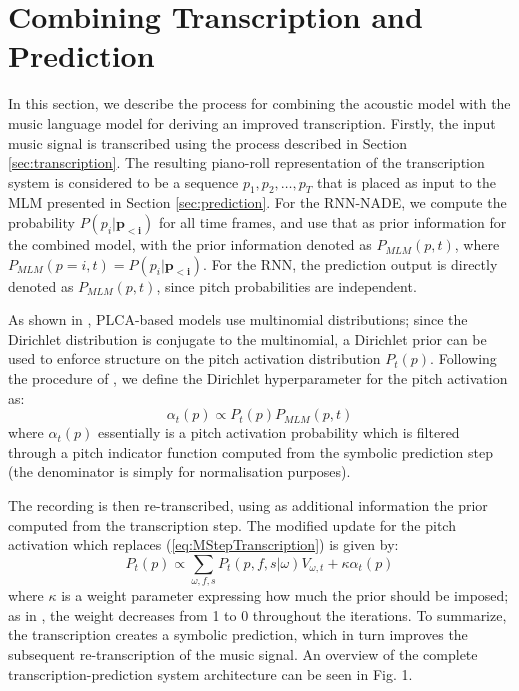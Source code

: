 \section{Combining Transcription and Prediction}
\label{sec:combination}


In this section, we describe the process for combining the acoustic model with the music language model for deriving an improved transcription. Firstly, the input music signal is transcribed using the process described in Section \ref{sec:transcription}. The resulting piano-roll representation of the transcription system is considered to be a sequence $p_1, p_2, \ldots, p_T$ that is placed as input to the MLM presented in Section \ref{sec:prediction}. For the RNN-NADE, we compute the probability $P(p_i|\mathbf{p_{<i}})$ for all time frames, and use that as prior information for the combined model, with the prior information  denoted as $P_{\mathit{MLM}}(p,t)$, where $P_{\mathit{MLM}}(p=i,t)=P(p_i|\mathbf{p_{<i}})$. For the RNN, the prediction output is directly denoted as $P_{\mathit{MLM}}(p,t)$, since pitch probabilities are independent.

As shown in \cite{Smaragdis2009}, PLCA-based models use multinomial distributions; since the Dirichlet distribution is conjugate to the multinomial, a Dirichlet prior can be used to enforce structure on the pitch activation distribution $P_{t}(p)$. Following the procedure of \cite{Smaragdis2009}, we define the Dirichlet hyperparameter for the pitch activation as:
\begin{equation}
 \alpha_{t}(p) \propto P_{t}(p)P_{\mathit{MLM}}(p,t)
\end{equation}
where $\alpha_{t}(p)$ essentially is a pitch activation probability which is filtered through a pitch indicator function computed from the symbolic prediction step (the denominator is simply for normalisation purposes).

The recording is then re-transcribed, using as additional information the prior computed from the transcription step. The modified update for the pitch activation which replaces (\ref{eq:MStepTranscription}) is given by:
\begin{equation}
 P_{t}(p) \propto \sum_{\omega,f,s}P_{t}(p,f,s|\omega)V_{\omega,t}+\kappa\alpha_{t}(p) \label{eq:modifiedMStepPitchActivation}
\end{equation}
where $\kappa$ is a weight parameter expressing how much the prior should be imposed; as in \cite{Smaragdis2009}, the weight decreases from 1 to 0 throughout the iterations. To summarize, the transcription creates a symbolic prediction, which in turn improves the subsequent re-transcription of the music signal. An overview of the complete transcription-prediction system architecture can be seen in Fig. 1.

